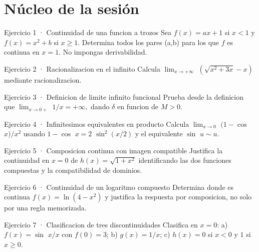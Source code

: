 \documentclass[10pt,a4paper,oneside,openany]{book}
\begin{document}
\section*{Núcleo de la sesión}
\begin{PSevenExerciseFixed}{Ejercicio 1 · Continuidad de una funcion a trozos}
Sea \(f(x)=ax+1\) si \(x<1\) y \(f(x)=x^{2}+b\) si \(x\ge 1\). Determina todos los pares (a,b) para los que \(f\) es continua en \(x=1\). No impongas derivabilidad.
\end{PSevenExerciseFixed}
\begin{PSevenExerciseFixed}{Ejercicio 2 · Racionalizacion en el infinito}
Calcula \(\lim_{x\to +\infty }\) \((\sqrt{x^{2}+3x}-x)\) mediante racionalizacion.
\end{PSevenExerciseFixed}
\begin{PSevenExerciseFixed}{Ejercicio 3 · Definicion de limite infinito funcional}
Prueba desde la definicion que \(\lim_{x\to 0+}\) \(1/x=+\infty ,\) dando \(\delta \) en funcion de \(M>0\).
\end{PSevenExerciseFixed}
\begin{PSevenExerciseFixed}{Ejercicio 4 · Infinitesimos equivalentes en producto}
Calcula \(\lim_{x\to 0}\) \((1-\cos\) \(x)/x^{2}\) usando \(1-\cos\) \(x=2\) \(\sin^{2}(x/2)\) y el equivalente \(\sin\) \(u\sim u\).
\end{PSevenExerciseFixed}
\begin{PSevenExerciseFixed}{Ejercicio 5 · Composicion continua con imagen compatible}
Justifica la continuidad en \(x=0\) de \(h(x)=\sqrt{1+x^{2}}\) identificando las dos funciones compuestas y la compatibilidad de dominios.
\end{PSevenExerciseFixed}
\begin{PSevenExerciseFixed}{Ejercicio 6 · Continuidad de un logaritmo compuesto}
Determina donde es continua \(f(x)=\ln(4-x^{2})\) y justifica la respuesta por composicion, no solo por una regla memorizada.
\end{PSevenExerciseFixed}
\begin{PSevenExerciseFixed}{Ejercicio 7 · Clasificacion de tres discontinuidades}
Clasifica en \(x=0\): a) \(f(x)=\sin\) \(x/x\) con \(f(0)=3\); b) \(g(x)=1/x\); c) \(h(x)=0\) si \(x<0\) y \(1\) si \(x\ge 0\).
\end{PSevenExerciseFixed}
\end{document}
